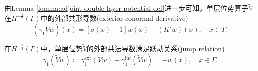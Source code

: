 由Lemma \ref{lemma:adjoint-double-layer-potential-def}进一步可知，单层位势算子$\widetilde{V}$在$H^{-\frac{1}{2}}(\Gamma)$中的外部共形导数(exterior conormal derivative)
\begin{equation*}
  \left( \gamma_{1} \widetilde{V} w \right)(x) =
  \left[
  \sigma(x) - 1
  \right] w(x)
  + \left( K' w \right)(x), \quad x \in \Gamma.
\end{equation*}

\begin{lemma}[单层位势外部共形导数的跃动关系]
  \label{lemma:bvp-jump-relation}
  在$ H^{-\frac{1}{2}}(\Gamma)$中，单层位势$\widetilde{V}$的外部共法导数满足跃动关系(jump relation)
  \begin{equation}
    \label{eq:bvp-jump-relation}
     \gamma_{1} \left( \widetilde{V} w \right)  \coloneqq
    \gamma_{1}^{\text{ext}} \left( V w \right)
    - \gamma_{1}^{\text{int}} \left( \widetilde{V} w \right)
    = - w(x), \quad x \in \Gamma.
  \end{equation}
\end{lemma}

